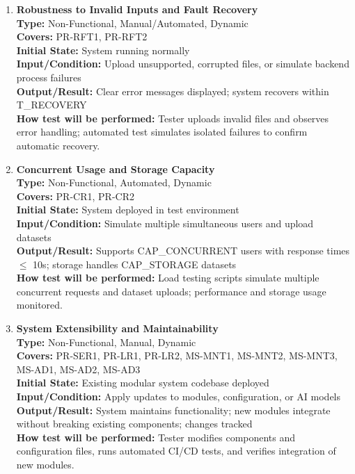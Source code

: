\documentclass[12pt, titlepage]{article}
\begin{document}
\begin{enumerate}[label=NFR-ST \arabic*., wide=0pt, leftmargin=*]
  \item \textbf{Robustness to Invalid Inputs and Fault Recovery} \\[2mm]
    \textbf{Type:} Non-Functional, Manual/Automated, Dynamic \\
    \textbf{Covers:} PR-RFT1, PR-RFT2 \\
    \textbf{Initial State:} System running normally \\
    \textbf{Input/Condition:} Upload unsupported, corrupted files, or
    simulate backend process failures \\
    \textbf{Output/Result:} Clear error messages displayed; system
    recovers within T\_RECOVERY \\[2mm]
    \textbf{How test will be performed:} Tester uploads invalid files
    and observes error handling; automated test simulates isolated
    failures to confirm automatic recovery.

  \item \textbf{Concurrent Usage and Storage Capacity} \\[2mm]
    \textbf{Type:} Non-Functional, Automated, Dynamic \\
    \textbf{Covers:} PR-CR1, PR-CR2 \\
    \textbf{Initial State:} System deployed in test environment \\
    \textbf{Input/Condition:} Simulate multiple simultaneous users
    and upload datasets \\
    \textbf{Output/Result:} Supports CAP\_CONCURRENT users with
    response times $\le$ 10s; storage handles CAP\_STORAGE datasets \\[2mm]
    \textbf{How test will be performed:} Load testing scripts
    simulate multiple concurrent requests and dataset uploads;
    performance and storage usage monitored.

  \item \textbf{System Extensibility and Maintainability} \\[2mm]
    \textbf{Type:} Non-Functional, Manual, Dynamic \\
    \textbf{Covers:} PR-SER1, PR-LR1, PR-LR2, MS-MNT1, MS-MNT2,
    MS-MNT3, MS-AD1, MS-AD2, MS-AD3 \\
    \textbf{Initial State:} Existing modular system codebase deployed \\
    \textbf{Input/Condition:} Apply updates to modules,
    configuration, or AI models \\
    \textbf{Output/Result:} System maintains functionality; new
    modules integrate without breaking existing components; changes
    tracked \\[2mm]
    \textbf{How test will be performed:} Tester modifies components
    and configuration files, runs automated CI/CD tests, and verifies
    integration of new modules.


\end{enumerate}
\end{document}
